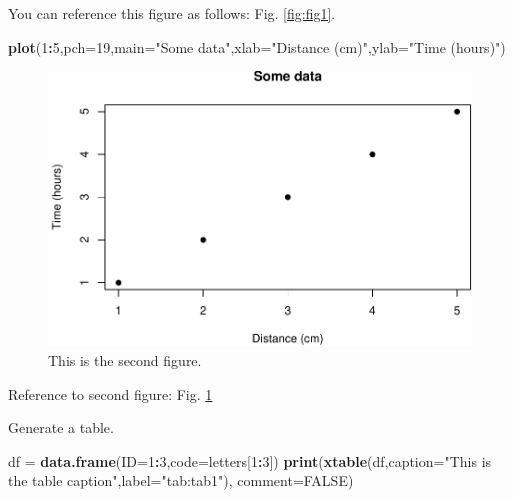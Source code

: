 \documentclass[12pt,halfline,a4paper,]{ouparticle}
\newenvironment{Shaded}{\begin{snugshade}}{\end{snugshade}}
\newcommand{\DataTypeTok}[1]{\textcolor[rgb]{0.13,0.29,0.53}{#1}}
\newcommand{\DecValTok}[1]{\textcolor[rgb]{0.00,0.00,0.81}{#1}}
\newcommand{\KeywordTok}[1]{\textcolor[rgb]{0.13,0.29,0.53}{\textbf{#1}}}
\newcommand{\NormalTok}[1]{#1}
\newcommand{\OperatorTok}[1]{\textcolor[rgb]{0.81,0.36,0.00}{\textbf{#1}}}
\newcommand{\OtherTok}[1]{\textcolor[rgb]{0.56,0.35,0.01}{#1}}
\newcommand{\StringTok}[1]{\textcolor[rgb]{0.31,0.60,0.02}{#1}}
\begin{document}
You can reference this figure as follows: Fig. \ref{fig:fig1}.

\begin{Shaded}
\begin{Highlighting}[]
\KeywordTok{plot}\NormalTok{(}\DecValTok{1}\OperatorTok{:}\DecValTok{5}\NormalTok{,}\DataTypeTok{pch=}\DecValTok{19}\NormalTok{,}\DataTypeTok{main=}\StringTok{"Some data"}\NormalTok{,}\DataTypeTok{xlab=}\StringTok{"Distance (cm)"}\NormalTok{,}\DataTypeTok{ylab=}\StringTok{"Time (hours)"}\NormalTok{)}
\end{Highlighting}
\end{Shaded}

\begin{figure}[p]
\includegraphics[width=1\linewidth]{sigminer-paper_files/figure-latex/fig2-1} \caption{This is the second figure.}\label{fig:fig2}
\end{figure}

Reference to second figure: Fig. \ref{fig:fig2}

Generate a table.

\begin{Shaded}
\begin{Highlighting}[]
\NormalTok{df =}\StringTok{ }\KeywordTok{data.frame}\NormalTok{(}\DataTypeTok{ID=}\DecValTok{1}\OperatorTok{:}\DecValTok{3}\NormalTok{,}\DataTypeTok{code=}\NormalTok{letters[}\DecValTok{1}\OperatorTok{:}\DecValTok{3}\NormalTok{])}
\KeywordTok{print}\NormalTok{(}\KeywordTok{xtable}\NormalTok{(df,}\DataTypeTok{caption=}\StringTok{"This is the table caption"}\NormalTok{,}\DataTypeTok{label=}\StringTok{"tab:tab1"}\NormalTok{),}
      \DataTypeTok{comment=}\OtherTok{FALSE}\NormalTok{)}
\end{Highlighting}
\end{Shaded}
\end{document}
